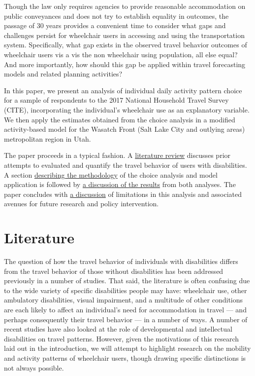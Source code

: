 \documentclass[3p, authoryear, review]{elsarticle} %
\begin{document}
Though the law only requires agencies to provide reasonable accommodation on
public conveyances and
does not try to establish equality in outcomes, the passage of 30 years provides a
convenient time to consider what gaps and challenges persist for wheelchair
users in accessing and using the transportation system. Specifically, what gap
exists in the observed travel behavior outcomes of wheelchair users vis a vis
the non wheelchair using population, all else equal? And more importantly, how
should this gap be applied within travel forecasting models and related planning
activities?

In this paper, we present an analysis of individual daily activity pattern choice
for a sample of respondents to the 2017 National Household Travel Survey (CITE),
incorporating the individual's wheelchair use as an explanatory variable.
We then apply the estimates obtained from the choice analysis in a modified
activity-based model for the Wasatch Front (Salt Lake City and outlying areas)
metropolitan region in Utah.

The paper proceeds in a typical fashion. A \protect\hyperlink{literature}{literature review}
discusses prior attempts to evaluated and quantify the travel behavior of
users with disabilities. A section \protect\hyperlink{methodology}{describing the methodology}
of the choice analysis and model application is followed by \protect\hyperlink{results}{a discussion of the results}
from both analyses. The paper concludes with \protect\hyperlink{discussion}{a discussion}
of limitations in this analysis and associated avenues for future research and
policy intervention.

\hypertarget{sec-literature}{%
\section{Literature}\label{sec-literature}}

The question of how the travel behavior of individuals with disabilities differs
from the travel behavior of those without disabilities has been addressed
previously in a number of studies. That said, the literature is often confusing
due to the wide variety of specific disabilities people may have: wheelchair use,
other ambulatory disabilities, visual impairment, and a multitude of other
conditions are each likely to affect an individual's need for accommodation in
travel --- and perhaps consequently their travel behavior --- in a number of ways.
A number of recent studies have also looked at the role of developmental \citet{Wasfi2007}
and intellectual \citet{Feeley2019} disabilities on travel patterns. However,
given the motivations of this research laid out in the introduction, we will attempt to highlight
research on the mobility and activity patterns of wheelchair users, though
drawing specific distinctions is not always possible.
\end{document}
